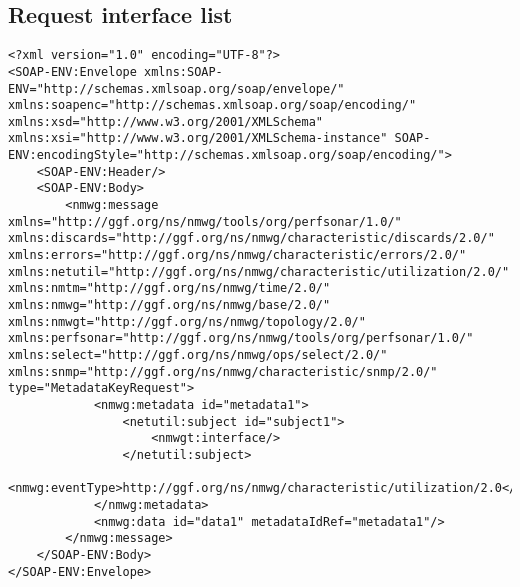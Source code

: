 \documentclass[a4paper,12pt,titlepage,hidelinks,fleqn]{article}
\begin{document}
\subsection{Request interface list}
\begin{flushleft}
\begin{framed}
\begin{lstlisting}
<?xml version="1.0" encoding="UTF-8"?>
<SOAP-ENV:Envelope xmlns:SOAP-ENV="http://schemas.xmlsoap.org/soap/envelope/" xmlns:soapenc="http://schemas.xmlsoap.org/soap/encoding/" xmlns:xsd="http://www.w3.org/2001/XMLSchema" xmlns:xsi="http://www.w3.org/2001/XMLSchema-instance" SOAP-ENV:encodingStyle="http://schemas.xmlsoap.org/soap/encoding/">
	<SOAP-ENV:Header/>
	<SOAP-ENV:Body>
		<nmwg:message xmlns="http://ggf.org/ns/nmwg/tools/org/perfsonar/1.0/" xmlns:discards="http://ggf.org/ns/nmwg/characteristic/discards/2.0/" xmlns:errors="http://ggf.org/ns/nmwg/characteristic/errors/2.0/" xmlns:netutil="http://ggf.org/ns/nmwg/characteristic/utilization/2.0/" xmlns:nmtm="http://ggf.org/ns/nmwg/time/2.0/" xmlns:nmwg="http://ggf.org/ns/nmwg/base/2.0/" xmlns:nmwgt="http://ggf.org/ns/nmwg/topology/2.0/" xmlns:perfsonar="http://ggf.org/ns/nmwg/tools/org/perfsonar/1.0/" xmlns:select="http://ggf.org/ns/nmwg/ops/select/2.0/" xmlns:snmp="http://ggf.org/ns/nmwg/characteristic/snmp/2.0/" type="MetadataKeyRequest">
			<nmwg:metadata id="metadata1">
				<netutil:subject id="subject1">
					<nmwgt:interface/>
				</netutil:subject>
				<nmwg:eventType>http://ggf.org/ns/nmwg/characteristic/utilization/2.0</nmwg:eventType>
			</nmwg:metadata>
			<nmwg:data id="data1" metadataIdRef="metadata1"/>
		</nmwg:message>
	</SOAP-ENV:Body>
</SOAP-ENV:Envelope>
\end{lstlisting}
\end{framed}
\end{flushleft}
\end{document}
